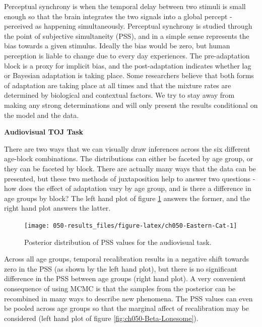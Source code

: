 \documentclass[11pt, oneside, openany]{scrbook}
\begin{document}
Perceptual synchrony is when the temporal delay between two stimuli is small enough so that the brain integrates the two signals into a global percept - perceived as happening simultaneously. Perceptual synchrony is studied through the point of subjective simultaneity (PSS), and in a simple sense represents the bias towards a given stimulus. Ideally the bias would be zero, but human perception is liable to change due to every day experiences. The pre-adaptation block is a proxy for implicit bias, and the post-adaptation indicates whether lag or Bayesian adaptation is taking place. Some researchers believe that both forms of adaptation are taking place at all times and that the mixture rates are determined by biological and contextual factors. We try to stay away from making any strong determinations and will only present the results conditional on the model and the data.

\textbf{Audiovisual TOJ Task}

There are two ways that we can visually draw inferences across the six different age-block combinations. The distributions can either be faceted by age group, or they can be faceted by block. There are actually many ways that the data can be presented, but these two methods of juxtaposition help to answer two questions - how does the effect of adaptation vary by age group, and is there a difference in age groups by block? The left hand plot of figure \ref{fig:ch050-Eastern-Cat} answers the former, and the right hand plot answers the latter.

\begin{figure}

{\centering \texttt{[image: 050-results\_files/figure-latex/ch050-Eastern-Cat-1]} 

}

\caption{Posterior distribution of PSS values for the audiovisual task.}\label{fig:ch050-Eastern-Cat}
\end{figure}

Across all age groups, temporal recalibration results in a negative shift towards zero in the PSS (as shown by the left hand plot), but there is no significant difference in the PSS between age groups (right hand plot). A very convenient consequence of using MCMC is that the samples from the posterior can be recombined in many ways to describe new phenomena. The PSS values can even be pooled across age groups so that the marginal affect of recalibration may be considered (left hand plot of figure \ref{fig:ch050-Beta-Lonesome}).
\end{document}
